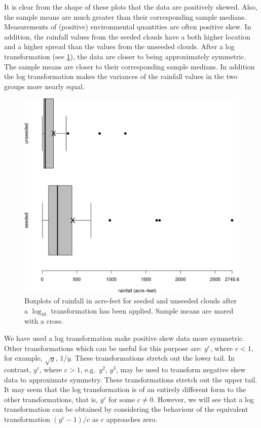 \documentclass[
  british,
]{book}
\begin{document}
It is clear from the shape of these plots that the data are positively skewed. Also, the sample means are much greater than their corresponding sample medians. Measurements of (positive) environmental quantities are often positive skew. In addition, the rainfall values from the seeded clouds have a both higher location and a higher spread than the values from the unseeded clouds. After a log transformation (see \ref{fig:cloudboxlog}), the data are closer to being approximately symmetric. The sample means are closer to their corresponding sample medians. In addition the log transformation makes the variances of the rainfall values in the two groups more nearly equal.

\begin{figure}

{\centering \includegraphics[width=0.8\linewidth]{images/cloud_box} 

}

\caption{Boxplots of rainfall in acre-feet for seeded and unseeded clouds after a $\log_{10}$ transformation has been applied.  Sample means are mared with a cross.}\label{fig:cloudboxlog}
\end{figure}
\FloatBarrier

We have used a log transformation make positive skew data more symmetric. Other transformations which can be useful for this purpose are: \(y^c\), where \(c<1\), for example, \(\sqrt{y}\), \(1/y\). These transformations stretch out the lower tail. In contrast, \(y^c\), where \(c>1\), e.g.~\(y^2\), \(y^3\), may be used to transform negative skew data to approximate symmetry. These transformations stretch out the upper tail. It may seem that the log transformation is of an entirely different form to the other transformations, that is, \(y^c\) for some \(c \neq 0\). However, we will see that a log transformation can be obtained by considering the behaviour of the equivalent transformation \((y^c - 1) / c\) as \(c\) approaches zero.
\end{document}
